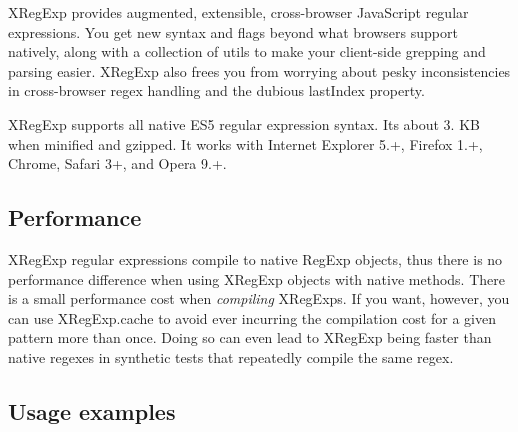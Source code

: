 X\+Reg\+Exp provides augmented, extensible, cross-\/browser Java\+Script regular expressions. You get new syntax and flags beyond what browsers support natively, along with a collection of utils to make your client-\/side grepping and parsing easier. X\+Reg\+Exp also frees you from worrying about pesky inconsistencies in cross-\/browser regex handling and the dubious {\ttfamily last\+Index} property.

X\+Reg\+Exp supports all native E\+S5 regular expression syntax. It\textquotesingle{}s about 3. KB when minified and gzipped. It works with Internet Explorer 5.+, Firefox 1.+, Chrome, Safari 3+, and Opera 9.+.

\subsection*{Performance}

X\+Reg\+Exp regular expressions compile to native Reg\+Exp objects, thus there is no performance difference when using X\+Reg\+Exp objects with native methods. There is a small performance cost when {\itshape compiling} X\+Reg\+Exps. If you want, however, you can use {\ttfamily X\+Reg\+Exp.\+cache} to avoid ever incurring the compilation cost for a given pattern more than once. Doing so can even lead to X\+Reg\+Exp being faster than native regexes in synthetic tests that repeatedly compile the same regex.

\subsection*{Usage examples}


